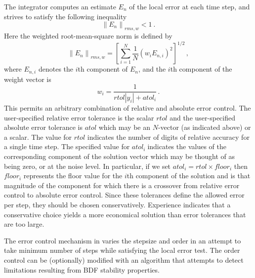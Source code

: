 The integrator computes an estimate $E_{n}$ of the local error at each time
step, and strives to satisfy the following inequality
\begin{equation*}%
\left\| E_n\right\|_{rms,w} < 1 ~.
\end{equation*}
Here the weighted root-mean-square norm is defined by
\begin{equation}\label{e:rms}
\left\| E_n\right\|_{rms,w}=\left[ \sum_{i=1}^N\frac{1}{N}\left(
w_iE_{n,i}\right) ^2\right] ^{1/2} \, ,
\end{equation}
where $E_{n,i}$ denotes the $i$th component of $E_n$, and the $i$th 
component of the weight vector is 
\begin{equation}\label{e:weight}
w_i=\frac{1}{rtol|y_i|+atol_i} \,.
\end{equation}
This permits an arbitrary combination of relative and absolute error control.
The user-specified relative error tolerance is the scalar $rtol$ and the
user-specified absolute error tolerance is $atol$ which may be an $N$-vector
(as indicated above) or a scalar. The value for $rtol$
indicates the number of digits of relative accuracy for a single time step.
The specified value for $atol_{i}\;$indicates the values of the
corresponding component of the solution vector which may be thought of as
being zero, or at the noise level. In particular, if we set 
$atol_i=rtol\times floor_i$ then $floor_i$ represents the floor value for the 
$i$th component of the solution and is that magnitude of the component for
which there is a crossover from relative error control to absolute error
control. Since these tolerances define the allowed error per step, they
should be chosen conservatively. Experience indicates that a conservative
choice yields a more economical solution than error tolerances that are too
large.

The error control mechanism in {\cvodes} varies the stepsize and order
in an attempt to take minimum number of steps while satisfying the local
error test. The order control can be (optionally) modified with an algorithm
that attempts to detect limitations resulting from BDF stability properties.

